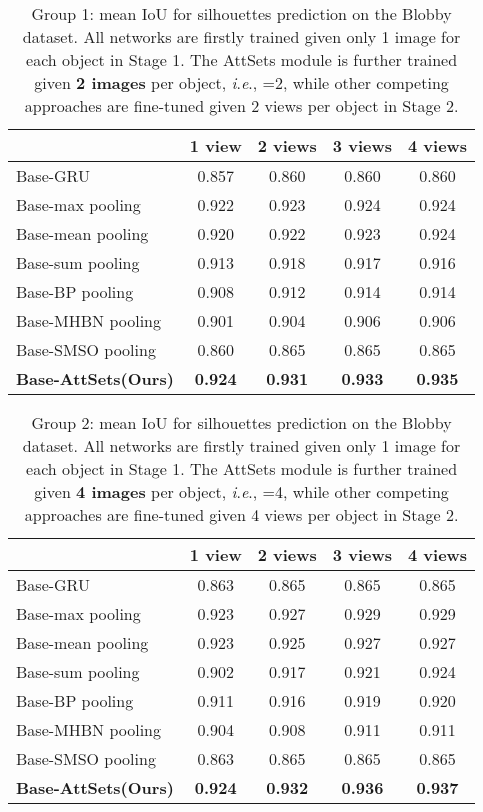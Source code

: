 \documentclass[twocolumn]{svjour3}    \pdfoutput=1
\newcommand{\nickname}{AttSets}
\newcommand{\ie}{\textit{i}.\textit{e}., }
\begin{document}
\begin{table}[ht]
\caption{Group 1: mean IoU for silhouettes prediction on the Blobby dataset. All networks are firstly trained given only 1 image for each object in Stage 1. The \nickname{} module is further trained given \textbf{2 images} per object, \ie  =2, while other competing approaches are fine-tuned given 2 views per object in Stage 2.}
\centering
\label{tab:iou_blobby_02v}
\tabcolsep=0.05cm
\begin{tabular}{ l|cccc}
\hline
&1 view&2 views&3 views& 4 views \\
\hline
Base-GRU &0.857&0.860&0.860&0.860\\
Base-max pooling &0.922&0.923&0.924&0.924\\
Base-mean pooling &0.920&0.922&0.923&0.924\\
Base-sum pooling &0.913&0.918&0.917&0.916\\
Base-BP pooling &0.908&0.912&0.914&0.914\\
Base-MHBN pooling &0.901&0.904&0.906&0.906\\
Base-SMSO pooling &0.860&0.865&0.865&0.865\\
\textbf{Base-\nickname{}(Ours)} &\textbf{0.924}&\textbf{0.931}&\textbf{0.933}&\textbf{0.935} \\
\hline
\end{tabular}
\vspace{-0.35 cm}
\end{table}
\begin{table}[h]
\caption{Group 2: mean IoU for silhouettes prediction on the Blobby dataset. All networks are firstly trained given only 1 image for each object in Stage 1. The \nickname{} module is further trained given \textbf{4 images} per object, \ie =4, while other competing approaches are fine-tuned given 4 views per object in Stage 2.}
\centering
\label{tab:iou_blobby_04v}
\tabcolsep=0.05cm
\begin{tabular}{ l|cccc}
\hline
&1 view&2 views&3 views& 4 views \\
\hline
Base-GRU &0.863&0.865&0.865&0.865\\
Base-max pooling &0.923&0.927&0.929&0.929\\
Base-mean pooling &0.923&0.925&0.927&0.927\\
Base-sum pooling &0.902&0.917&0.921&0.924\\
Base-BP pooling &0.911&0.916&0.919&0.920\\
Base-MHBN pooling &0.904&0.908&0.911&0.911\\
Base-SMSO pooling &0.863&0.865&0.865&0.865\\
\textbf{Base-\nickname{}(Ours)} &\textbf{0.924}&\textbf{0.932}&\textbf{0.936}&\textbf{0.937} \\
\hline
\end{tabular}
\vspace{-0.35 cm}
\end{table}
\end{document}
